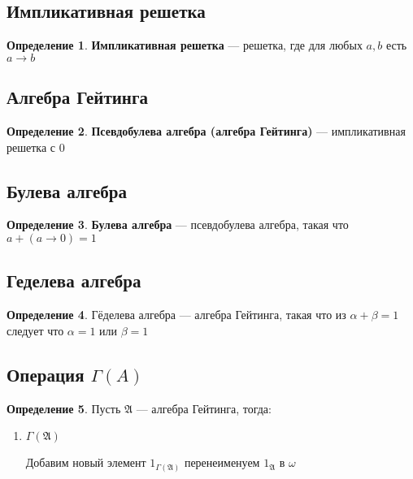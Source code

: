 \documentclass[english]{article}
\newcommand{\A}{\mathfrak{A}}
\theoremstyle{plain}
\theoremstyle{remark}
\theoremstyle{definition}
\newtheorem*{definition}{Определение}
\begin{document}
\subsection{Импликативная решетка}
\label{sec:org6afaa4a}
\begin{definition}
\textbf{Импликативная решетка} --- решетка, где для любых \(a, b\) есть \(a \to b\)
\label{orgf9d03f8}
\end{definition}
\subsection{Алгебра Гейтинга}
\label{sec:org9dd669a}
\begin{definition}
\textbf{Псевдобулева алгебра (алгебра Гейтинга)} --- импликативная решетка с \(0\)
\label{org7f6779b}
\end{definition}
\subsection{Булева алгебра}
\label{sec:org9ef96c2}
\begin{definition}
\textbf{Булева алгебра} --- псевдобулева алгебра, такая что \(a + (a \to 0) = 1\)
\label{org48a5e7f}
\end{definition}
\subsection{Геделева алгебра}
\label{sec:org3759eff}
\begin{definition}
Гёделева алгебра --- алгебра Гейтинга, такая что из \(\alpha + \beta = 1\) следует что \(\alpha = 1\) или \(\beta = 1\) \\
\label{orgba0995a}
\end{definition}
\subsection{Операция \(\Gamma(A)\)}
\label{sec:org51d75d9}
\begin{definition}
Пусть \(\A\) --- алгебра Гейтинга, тогда:
\begin{enumerate}
\item \(\Gamma(\A)\) \\
\begin{center}
\end{center}

Добавим новый элемент \(1_{\Gamma(\A)}\) перенеименуем \(1_\A\) в  \(\omega\)
\end{enumerate}
\label{org864fe88}
\end{definition}
\end{document}

